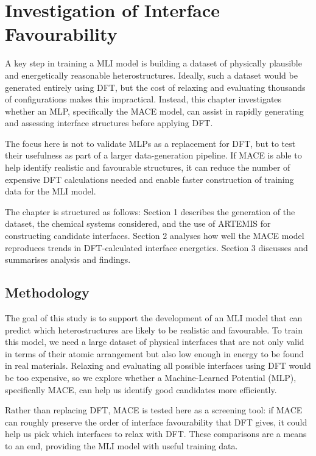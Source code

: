 \chapter{Investigation of Interface Favourability} \label{chapter:computational_investigation}

A key step in training a MLI model is building a dataset of physically plausible and energetically reasonable heterostructures\cite{Di_Liberto2022-gz, Batzner2022-fd}.
Ideally, such a dataset would be generated entirely using DFT, but the cost of relaxing and evaluating thousands of configurations makes this impractical\cite{Rosen2022-pw, Schutt2018-xc, Rosen2022-pw}.
Instead, this chapter investigates whether an MLP, specifically the MACE model, can assist in rapidly generating and assessing interface structures before applying DFT.

The focus here is not to validate MLPs as a replacement for DFT, but to test their usefulness as part of a larger data-generation pipeline.
If MACE is able to help identify realistic and favourable structures, it can reduce the number of expensive DFT calculations needed and enable faster construction of training data for the MLI model.

The chapter is structured as follows: Section 1 describes the generation of the dataset, the chemical systems considered, and the use of ARTEMIS for constructing candidate interfaces.
Section 2 analyses how well the MACE model reproduces trends in DFT-calculated interface energetics.
Section 3 discusses and summarises analysis and findings.

\section{Methodology} \label{section:methodology}

The goal of this study is to support the development of an MLI model that can predict which heterostructures are likely to be realistic and favourable.
To train this model, we need a large dataset of physical interfaces that are not only valid in terms of their atomic arrangement but also low enough in energy to be found in real materials.
Relaxing and evaluating all possible interfaces using DFT would be too expensive, so we explore whether a Machine-Learned Potential (MLP), specifically MACE, can help us identify good candidates more efficiently.

Rather than replacing DFT, MACE is tested here as a screening tool: if MACE can roughly preserve the order of interface favourability that DFT gives, it could help us pick which interfaces to relax with DFT.
These comparisons are a means to an end, providing the MLI model with useful training data.

